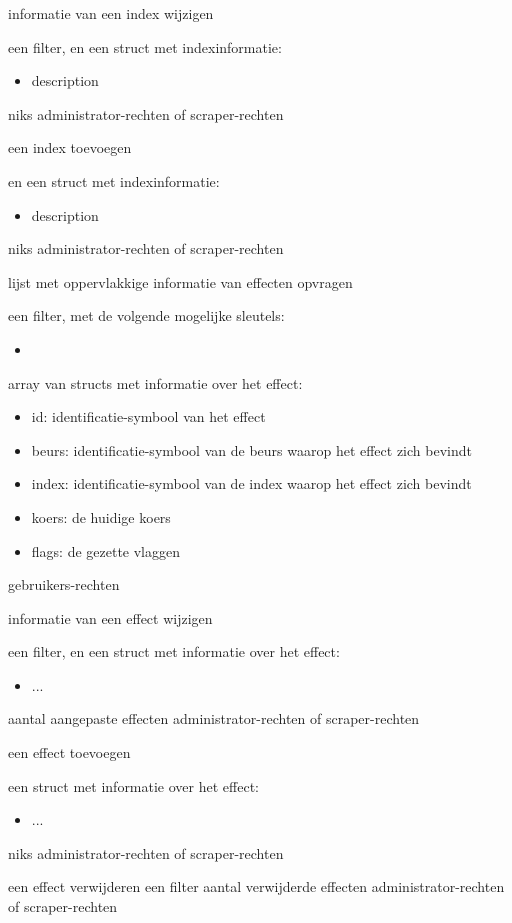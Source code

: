 	{ informatie van een index wijzigen }
	{ een filter, en een struct met indexinformatie:
		\begin{itemize}
		\item{description}
		\end{itemize} }
	{ niks }
	{ administrator-rechten of scraper-rechten }

	{ een index toevoegen }
	{ en een struct met indexinformatie:
		\begin{itemize}
		\item{description}
		\end{itemize} }
	{ niks }
	{ administrator-rechten of scraper-rechten }

	{ lijst met oppervlakkige informatie van effecten opvragen }
	{ een filter, met de volgende mogelijke sleutels:
		\begin{itemize}
		\item{}
		\end{itemize} }
	{ array van structs met informatie over het effect:
		\begin{itemize}
		\item{id: identificatie-symbool van het effect}
		\item{beurs: identificatie-symbool van de beurs waarop het effect zich bevindt}
		\item{index: identificatie-symbool van de index waarop het effect zich bevindt}
		\item{koers: de huidige koers}
		\item{flags: de gezette vlaggen}
		\end{itemize} }
	{ gebruikers-rechten }

	{ informatie van een effect wijzigen }
	{ een filter, en een struct met informatie over het effect:
		\begin{itemize}
		\item{...}
		\end{itemize} }
	{ aantal aangepaste effecten }
	{ administrator-rechten of scraper-rechten }

	{ een effect toevoegen }
	{ een struct met informatie over het effect:
		\begin{itemize}
		\item{...}
		\end{itemize} }
	{ niks }
	{ administrator-rechten of scraper-rechten }
	
{ een effect verwijderen }
{ een filter }
{ aantal verwijderde effecten }
{ administrator-rechten of scraper-rechten }

